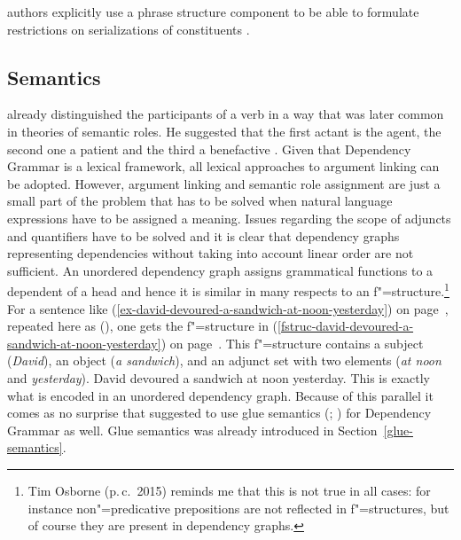 authors explicitly use a phrase structure component to be able to formulate restrictions on
serializations of constituents \citep{GK2001a,Hellwig2003a}. 



\subsection{Semantics}

\tes already distinguished the participants of a verb in a way that was later common in theories of
semantic roles. He suggested that the first actant is the agent, the second one a patient and the
third a benefactive \citep[Chapter~106]{Tesniere2015a-u}.
Given that Dependency Grammar is a lexical framework, all
lexical approaches to argument linking can be adopted. However, argument linking and semantic
role assignment are just a small part of the problem that has to be solved when natural language
expressions have to be assigned a meaning. 
Issues regarding the scope of adjuncts and quantifiers
have to be solved and it is clear that dependency graphs representing dependencies without taking
into account linear order are not sufficient. An unordered dependency graph assigns grammatical
functions to a dependent of a head and hence it is similar in many respects to an \lfg
f"=structure.\footnote{%
Tim Osborne (p.\,c.\ 2015) reminds me that this is not true in all cases: for instance non"=predicative prepositions are not reflected in f"=structures, but of course they are present in
dependency graphs.
} For a sentence
like (\ref{ex-david-devoured-a-sandwich-at-noon-yesterday}) on page~\pageref{ex-david-devoured-a-sandwich-at-noon-yesterday}, repeated here as (), one gets
the f"=structure in (\ref{fstruc-david-devoured-a-sandwich-at-noon-yesterday}) on
page~\pageref{fstruc-david-devoured-a-sandwich-at-noon-yesterday}. This f"=structure contains a
subject (\emph{David}), an object (\emph{a sandwich}), and an adjunct set with two elements
(\emph{at noon} and \emph{yesterday}).
\ea
\label{ex-david-devoured-a-sandwich-at-noon-yesterday-two}
David devoured a sandwich at noon yesterday.
\z
This is exactly what is encoded in an unordered dependency graph. Because of this parallel it comes
as no surprise that \citet[]{Broeker2003a-u} suggested to use glue semantics
(\citealp*{DLS93a-u}; \citealp[Chapter~8]{Dalrymple2001a-u}) for Dependency
Grammar as well. Glue semantics was already introduced in Section~\ref{glue-semantics}.

